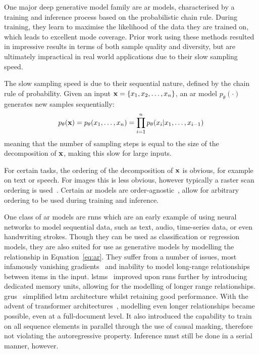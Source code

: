 One major deep generative model family are \acrfull{ar} models, characterised by
a training and inference process based on the probabilistic chain rule. During
training, they learn to maximise the likelihood of the data they are
trained on, which leads to excellent mode coverage. Prior work using these
methods resulted in impressive results in terms of both sample quality and
diversity, but are ultimately impractical in real world applications due to
their slow sampling speed.

The slow sampling speed is due to their sequential nature, defined by the chain
rule of probability. Given an input $\mathbf{x} = \{ x_{1}, x_{2}, \dots,
x_{n} \}$, an \gls{ar} model $p_\theta(\cdot)$ generates new
samples sequentially:
\begin{equation}\label{eq:ar}
    p_\theta(\mathbf{x}) = p_\theta(x_{1}, \dots, x_{n}) =
    \prod\limits^{n}_{i=1} p_\theta(x_{i} \vert x_{1}, \dots, x_{i-1})
\end{equation}
meaning that the number of sampling steps is equal to the size of the
decomposition of $\mathbf{x}$, making this slow for large inputs.

For certain tasks, the ordering of the decomposition of $\mathbf{x}$ is obvious, for
example on text or speech. For images this is less obvious, however typically a
raster scan ordering is used~\cite{parmar2018image}. Certain \gls{ar} models are
order-agnostic~\cite{hoogeboom2021autoregressive}, allow for arbitrary ordering
to be used during training and inference.

One class of \gls{ar} models are \glspl{rnn} which are an early example of using
neural networks to model sequential data, such as text, audio, time-series data,
or even handwriting strokes. Though they can be used as classification or
regression models, they are also suited for use as generative models by
modelling the relationship in Equation~\ref{eq:ar}. They suffer from a number of
issues, most infamously vanishing gradients~\cite{pascanu2012rnn} and inability
to model long-range relationships between items in the input.
\Glspl{lstm}~\cite{hoch1997lstm} improved upon \glspl{rnn} further by
introducing dedicated memory units, allowing for the modelling of longer range
relationships. \Glspl{gru}~\cite{cho2014gru} simplified \gls{lstm} architecture
whilst retaining good performance. With the advent of transformer
architectures~\cite{vaswani2017attention}, modelling even longer relationships
became possible, even at a full-document level. It also introduced the
capability to train on all sequence elements in parallel through the use of
causal masking, therefore not violating the autoregressive property. Inference
must still be done in a serial manner, however.

